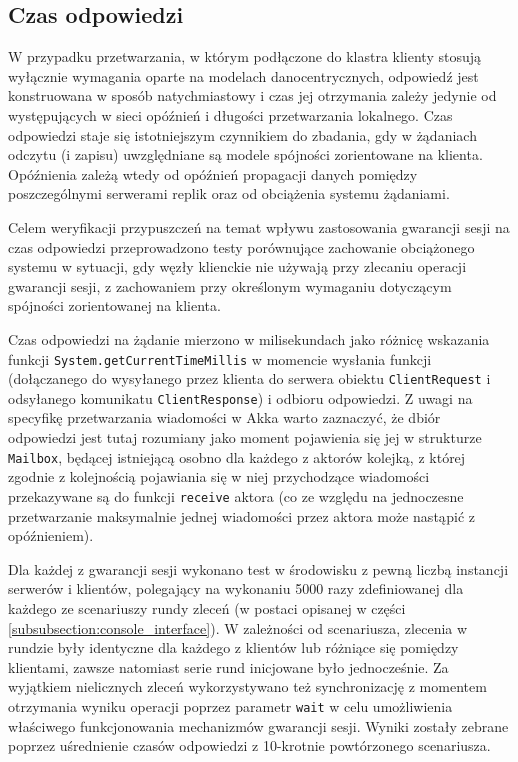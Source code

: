 
\subsection{Czas odpowiedzi}

W przypadku przetwarzania, w którym podłączone do klastra klienty stosują wyłącznie wymagania oparte na modelach danocentrycznych, odpowiedź jest konstruowana w sposób natychmiastowy i czas jej otrzymania zależy jedynie od występujących w sieci opóźnień i długości przetwarzania lokalnego. Czas odpowiedzi staje się istotniejszym czynnikiem do zbadania, gdy w żądaniach odczytu (i zapisu) uwzględniane są modele spójności zorientowane na klienta. Opóźnienia zależą wtedy od opóźnień propagacji danych pomiędzy poszczególnymi serwerami replik oraz od obciążenia systemu żądaniami.

Celem weryfikacji przypuszczeń na temat wpływu zastosowania gwarancji sesji na czas odpowiedzi przeprowadzono testy porównujące zachowanie obciążonego systemu w sytuacji, gdy węzły klienckie nie używają przy zlecaniu operacji gwarancji sesji, z zachowaniem przy określonym wymaganiu dotyczącym spójności zorientowanej na klienta.

Czas odpowiedzi na żądanie mierzono w milisekundach jako różnicę wskazania funkcji \texttt{System.getCurrentTimeMillis} w momencie wysłania funkcji (dołączanego do wysyłanego przez klienta do serwera obiektu \texttt{ClientRequest} i odsyłanego komunikatu \texttt{ClientResponse}) i odbioru odpowiedzi. Z uwagi na specyfikę przetwarzania wiadomości w Akka warto zaznaczyć, że dbiór odpowiedzi jest tutaj rozumiany jako moment pojawienia się jej w strukturze \texttt{Mailbox}, będącej istniejącą osobno dla każdego z aktorów kolejką, z której zgodnie z kolejnością pojawiania się w niej przychodzące wiadomości przekazywane są do funkcji \texttt{receive} aktora (co ze względu na jednoczesne przetwarzanie maksymalnie jednej wiadomości przez aktora może nastąpić z opóźnieniem).

Dla każdej z gwarancji sesji wykonano test w środowisku z pewną liczbą instancji serwerów i klientów, polegający na wykonaniu 5000 razy zdefiniowanej dla każdego ze scenariuszy rundy zleceń (w postaci opisanej w części \ref{subsubsection:console_interface}). W zależności od scenariusza, zlecenia w rundzie były identyczne dla każdego z klientów lub różniące się pomiędzy klientami, zawsze natomiast serie rund inicjowane było jednocześnie. Za wyjątkiem nielicznych zleceń wykorzystywano też synchronizację z momentem otrzymania wyniku operacji poprzez parametr \texttt{wait} w celu umożliwienia właściwego funkcjonowania mechanizmów gwarancji sesji. Wyniki zostały zebrane poprzez uśrednienie czasów odpowiedzi z 10-krotnie powtórzonego scenariusza.

